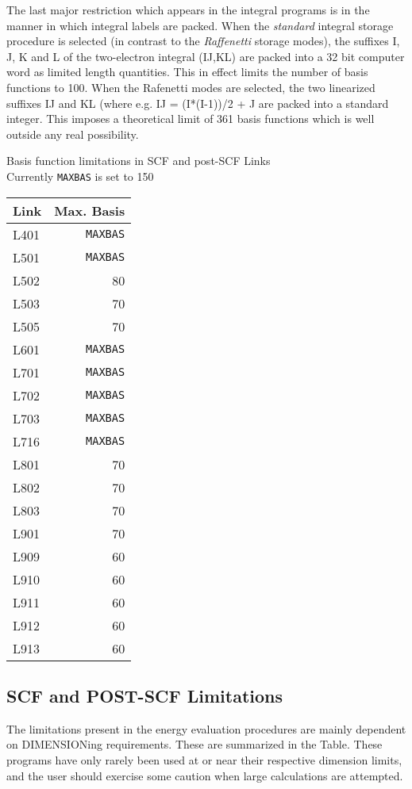 The last major restriction which appears in the integral programs is in the
manner in which integral labels are packed.  When the {\em standard} integral
storage procedure is selected (in contrast to the {\em Raffenetti} 
storage modes),
the suffixes I, J, K  and L of the two-electron integral (IJ,KL) are
packed into a 32 bit computer word as 
limited length quantities.  This in effect
limits the number of basis functions to 100.  When the Rafenetti modes
are selected, the two linearized suffixes IJ and KL (where e.g. 
IJ = (I*(I-1))/2 + J are packed into a standard integer.  
This imposes a theoretical
limit of 361 basis functions which is well outside any real possibility.
\newpage
\begin{center}
Basis function limitations in SCF
and post-SCF Links \\
Currently {\tt MAXBAS} is set to 150
\  \\
\begin{tabular}{|l|r|} \hline
Link & Max. Basis \\ \hline
L401 & {\tt MAXBAS} \\
\hline
L501 & {\tt MAXBAS} \\
L502 & 80 \\
L503 & 70 \\
L505 & 70  \\ 
\hline
L601 & {\tt MAXBAS} \\
\hline
L701 & {\tt MAXBAS} \\
L702 & {\tt MAXBAS} \\
L703 & {\tt MAXBAS} \\
L716 & {\tt MAXBAS} \\
\hline 
L801 & 70 \\
L802 & 70 \\
L803 & 70 \\
\hline
L901 & 70 \\
L909 & 60 \\
L910 & 60 \\
L911 & 60 \\
L912 & 60 \\
L913 & 60 \\ \hline
\end{tabular}
\end{center}
\newpage
\subsection{\sf SCF and POST-SCF Limitations}
The limitations present in the energy evaluation procedures are mainly
dependent on DIMENSIONing requirements.  These are summarized in the
Table.  These programs have only rarely been used at or near their
respective dimension limits, and the user should exercise some caution
when large calculations are attempted.
